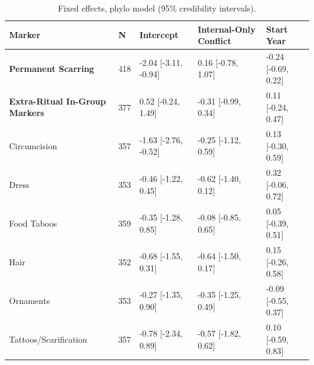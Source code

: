 \begin{table}[!ht]
\centering
\small
\caption{Fixed effects, phylo model (95\% credibility intervals).}
\label{tab:intonly_fixed_effects_phylo}
\begin{tabular}{p{4cm}llll}
\toprule
Marker & N & Intercept & Internal-Only Conflict & Start Year \\
\midrule
\textbf{Permanent Scarring} & 418 & -2.04 [-3.11, -0.94] & 0.16 [-0.78, 1.07] & -0.24 [-0.69, 0.22] \\
\textbf{Extra-Ritual In-Group Markers} & 377 & 0.52 [-0.24, 1.49] & -0.31 [-0.99, 0.34] & 0.11 [-0.24, 0.47] \\
\midrule
Circumcision & 357 & -1.63 [-2.76, -0.52] & -0.25 [-1.12, 0.59] & 0.13 [-0.30, 0.59] \\
Dress & 353 & -0.46 [-1.22, 0.45] & -0.62 [-1.40, 0.12] & 0.32 [-0.06, 0.72] \\
Food Taboos & 359 & -0.35 [-1.28, 0.85] & -0.08 [-0.85, 0.65] & 0.05 [-0.39, 0.51] \\
Hair & 352 & -0.68 [-1.55, 0.31] & -0.64 [-1.50, 0.17] & 0.15 [-0.26, 0.58] \\
Ornaments & 353 & -0.27 [-1.35, 0.90] & -0.35 [-1.25, 0.49] & -0.09 [-0.55, 0.37] \\
Tattoos/Scarification & 357 & -0.78 [-2.34, 0.89] & -0.57 [-1.82, 0.62] & 0.10 [-0.59, 0.83] \\
\bottomrule
\end{tabular}
\end{table}